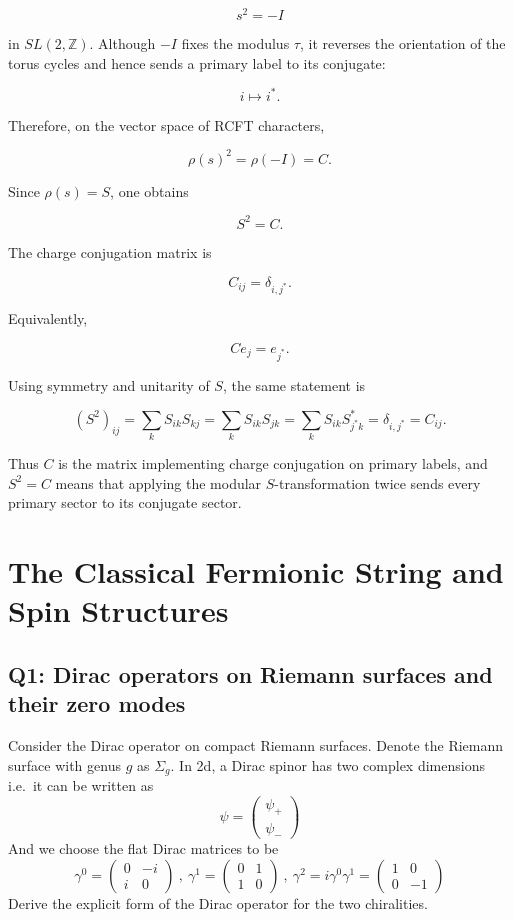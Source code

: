 \documentclass[
  10pt,
  a4paper,
  openany]{book}
\begin{document}
\[
s^2=-I
\]

in \(SL(2,\mathbb Z)\). Although \(-I\) fixes the modulus \(\tau\), it
reverses the orientation of the torus cycles and hence sends a primary
label to its conjugate:

\[
i \mapsto i^*.
\]

Therefore, on the vector space of RCFT characters,

\[
\rho(s)^2
=
\rho(-I)
=
C.
\]

Since \(\rho(s)=S\), one obtains

\[
S^2=C.
\]

The charge conjugation matrix is

\[
C_{ij}
=
\delta_{i,j^*}.
\]

Equivalently,

\[
C e_j
=
e_{j^*}.
\]

Using symmetry and unitarity of \(S\), the same statement is

\[
(S^2)_{ij}
=
\sum_k S_{ik}S_{kj}
=
\sum_k S_{ik}S_{jk}
=
\sum_k S_{ik}S_{j^*k}^*
=
\delta_{i,j^*}
=
C_{ij}.
\]

Thus \(C\) is the matrix implementing charge conjugation on primary
labels, and \(S^2=C\) means that applying the modular
\(S\)-transformation twice sends every primary sector to its conjugate
sector.

\chapter{The Classical Fermionic String and Spin
Structures}\label{the-classical-fermionic-string-and-spin-structures-1}

\section{Q1: Dirac operators on Riemann surfaces and their zero
modes}\label{q1-dirac-operators-on-riemann-surfaces-and-their-zero-modes}

Consider the Dirac operator on compact Riemann surfaces. Denote the
Riemann surface with genus \(g\) as \(\Sigma_{g}\). In 2d, a Dirac
spinor has two complex dimensions i.e.~it can be written as \[
\psi=\begin{pmatrix}
\psi_{+} \\
\psi_{-}
\end{pmatrix}
\] And we choose the flat Dirac matrices to be \[
\gamma^0=\begin{pmatrix}
0 & -i \\
i & 0
\end{pmatrix} \ , \ \gamma^1=\begin{pmatrix}
0 & 1 \\
1 & 0
\end{pmatrix} \  , \ \gamma^2=i\gamma^0\gamma^1=\begin{pmatrix}
1 & 0 \\
0 & -1
\end{pmatrix}
\] Derive the explicit form of the Dirac operator for the two
chiralities.
\end{document}
